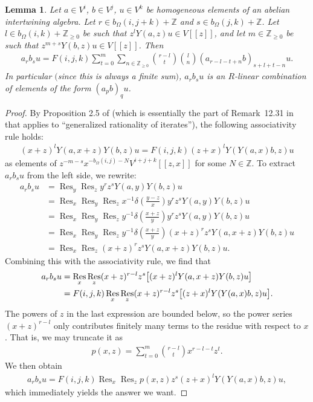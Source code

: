 \documentclass[pdftex]{sigma}
\newcommand{\bZ}{\mathbb{Z}}
\DeclareMathOperator{\Res}{Res}
\newtheorem{lem}[thm]{Lemma}
\theoremstyle{definition}
\begin{document}
\begin{lem} \label{lem:shorten-words}
Let $a \in V^i$, $b \in V^j$, $u \in V^k$ be homogeneous elements of an abelian intertwining algebra. Let $r \in b_\Omega(i,j+k)+\bZ$ and $s \in b_\Omega(j,k) + \bZ$. Let $l \in b_\Omega(i,k) + \bZ_{\geq 0}$ be such that $z^l Y(a,z) u \in V[[z]]$, and let $m \in \bZ_{\geq 0}$ be such that $z^{m+s} Y(b,z)u \in V[[z]]$. Then
\begin{gather*} a_r b_s u = F(i,j,k) \sum_{t=0}^m \sum_{n \in \bZ_{\geq 0}} \binom{r-l}{t} \binom{l}{n} (a_{r-l-t+n}b)_{s+l+t-n} u.\end{gather*}
In particular $($since this is always a finite sum$)$, $a_r b_s u$ is an $R$-linear combination of elements of the form $(a_p b)_q u$.
\end{lem}
\begin{proof}By Proposition 2.5 of \cite{L99a} (which is essentially the part of Remark~12.31 in~\cite{DL93} that applies to ``generalized rationality of iterates''), the following associativity rule holds:
\begin{gather*} (x + z)^l Y(a, x + z)Y(b,z)u = F(i,j,k)(z + x)^l Y(Y(a, x)b, z)u \end{gather*}
as elements of $z^{-m-s}x^{-b_\Omega(i,j)-N}V^{i+j+k}[[z,x]]$ for some $N \in \bZ$.
To extract $a_r b_s u$ from the left side, we rewrite:
\begin{align*}
a_r b_s u &= \Res_{y} \Res_{z} y^r z^s Y(a,y) Y(b,z)u \\
&= \Res_{x} \Res_{y} \Res_{z} x^{-1} \delta\left(\frac{y-z}{x} \right) y^r z^s Y(a,y) Y(b,z)u \\
&= \Res_{x} \Res_{y} \Res_{z} y^{-1} \delta\left(\frac{x+z}{y} \right) y^r z^s Y(a,y) Y(b,z)u \\
&= \Res_{x} \Res_{y} \Res_{z} y^{-1} \delta\left(\frac{x+z}{y} \right) (x+z)^r z^s Y(a,x + z) Y(b,z)u \\
&= \Res_{x} \Res_{z} (x+z)^r z^s Y(a,x + z) Y(b,z)u.
\end{align*}
Combining this with the associativity rule, we find that
 \begin{gather*}\begin{split}&
a_r b_s u = \Res_{x} \Res_{z} (x+z)^{r-l} z^s \big[(x+z)^l Y(a,x + z) Y(b,z)u \big] \\
& \hphantom{a_r b_s u }{}= F(i,j,k) \Res_{x} \Res_{z} (x+z)^{r-l} z^s \big[(z+x)^l Y(Y(a, x)b, z)u \big].\end{split}
\end{gather*}
The powers of $z$ in the last expression are bounded below, so the power series $(x+z)^{r-l}$ only contributes finitely many terms to the residue with respect to $x$. That is, we may truncate it as
\begin{gather*} p(x,z) = \sum_{t=0}^m \binom{r-l}{t} x^{r-l-t} z^t.\end{gather*}
We then obtain
\begin{gather*} a_r b_s u = F(i,j,k) \Res_{x} \Res_{z} p(x,z) z^s (z+x)^l Y(Y(a, x)b, z)u ,\end{gather*}
which immediately yields the answer we want.
\end{proof}
\end{document}
